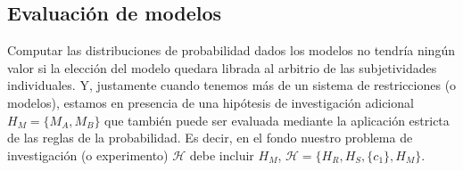 \documentclass[a4paper,11pt]{book}
\theoremstyle{definition}
\begin{document}
%
%
%
%
%



\subsection{Evaluaci\'on de modelos}

Computar las distribuciones de probabilidad dados los modelos no tendr\'ia ning\'un valor si la elecci\'on del modelo quedara librada al arbitrio de las subjetividades individuales.
%
Y, justamente cuando tenemos m\'as de un sistema de restricciones (o modelos), estamos en presencia de una hip\'otesis de investigaci\'on adicional $H_M = \{M_A, M_B\}$ que tambi\'en puede ser evaluada mediante la aplicaci\'on estricta de las reglas de la probabilidad.
Es decir, en el fondo nuestro problema de investigaci\'on (o experimento) $\mathcal{H}$ debe incluir $H_M$, $\mathcal{H} = \{H_R, H_S, \{c_1\}, H_M\}$.
\end{document}
